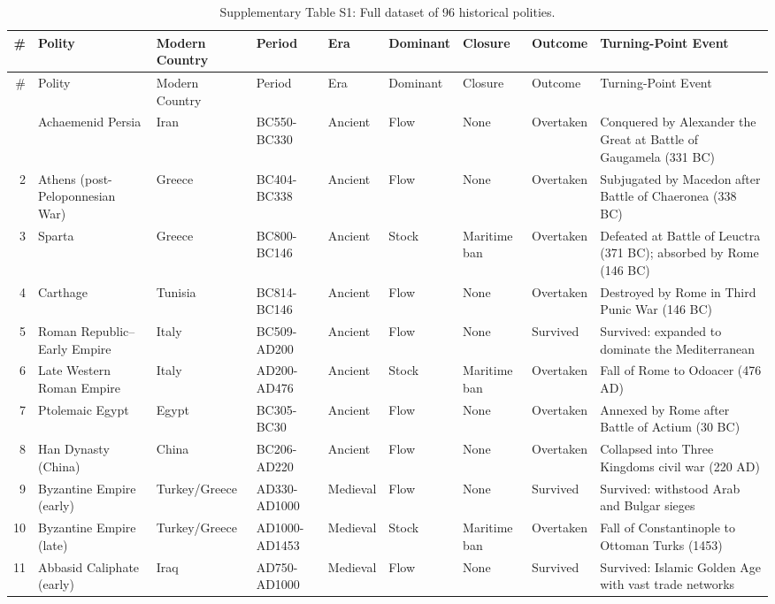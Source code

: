 \documentclass[11pt]{article}
\begin{document}
\scriptsize
\setlength{\LTleft}{0pt}
\setlength{\LTright}{0pt}
\begin{longtable}{@{}r l l l l l l l p{5.5cm}@{}}
\caption{Supplementary Table S1: Full dataset of 96 historical polities.} \\
\toprule
\# & Polity & Modern Country & Period & Era & Dominant & Closure & Outcome & Turning-Point Event \\
\midrule
\endfirsthead
\toprule
\# & Polity & Modern Country & Period & Era & Dominant & Closure & Outcome & Turning-Point Event \\
\midrule
\endhead
\midrule
\endfoot
\bottomrule
\endlastfoot
1 & Achaemenid Persia & Iran & BC550-BC330 & Ancient & Flow & None & Overtaken & Conquered by Alexander the Great at Battle of Gaugamela (331 BC) \\
2 & Athens (post-Peloponnesian War) & Greece & BC404-BC338 & Ancient & Flow & None & Overtaken & Subjugated by Macedon after Battle of Chaeronea (338 BC) \\
3 & Sparta & Greece & BC800-BC146 & Ancient & Stock & Maritime ban & Overtaken & Defeated at Battle of Leuctra (371 BC); absorbed by Rome (146 BC) \\
4 & Carthage & Tunisia & BC814-BC146 & Ancient & Flow & None & Overtaken & Destroyed by Rome in Third Punic War (146 BC) \\
5 & Roman Republic--Early Empire & Italy & BC509-AD200 & Ancient & Flow & None & Survived & Survived: expanded to dominate the Mediterranean \\
6 & Late Western Roman Empire & Italy & AD200-AD476 & Ancient & Stock & Maritime ban & Overtaken & Fall of Rome to Odoacer (476 AD) \\
7 & Ptolemaic Egypt & Egypt & BC305-BC30 & Ancient & Flow & None & Overtaken & Annexed by Rome after Battle of Actium (30 BC) \\
8 & Han Dynasty (China) & China & BC206-AD220 & Ancient & Flow & None & Overtaken & Collapsed into Three Kingdoms civil war (220 AD) \\
9 & Byzantine Empire (early) & Turkey/Greece & AD330-AD1000 & Medieval & Flow & None & Survived & Survived: withstood Arab and Bulgar sieges \\
10 & Byzantine Empire (late) & Turkey/Greece & AD1000-AD1453 & Medieval & Stock & Maritime ban & Overtaken & Fall of Constantinople to Ottoman Turks (1453) \\
11 & Abbasid Caliphate (early) & Iraq & AD750-AD1000 & Medieval & Flow & None & Survived & Survived: Islamic Golden Age with vast trade networks \\

\end{longtable}
\end{document}
